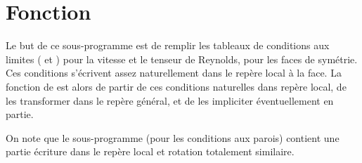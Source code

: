 %
% 
%
% 
% 
% 
%
%


\vspace{1cm}
\section{Fonction}
Le but de ce sous-programme est de remplir les tableaux de conditions aux
limites ( et ) pour la vitesse et le tenseur de Reynolds, 
pour les faces de sym\'etrie. Ces conditions s'\'ecrivent assez
naturellement dans le rep\`ere local \`a la face. La fonction de 
est alors de partir de ces conditions naturelles dans rep\`ere local, de les
transformer dans le rep\`ere g\'en\'eral, et de les impliciter \'eventuellement
en partie.

On note que le sous-programme  (pour les conditions aux parois)
contient une partie \'ecriture dans
le rep\`ere local et rotation totalement similaire.


